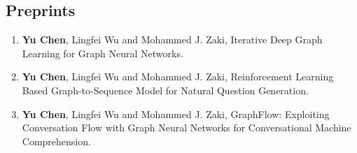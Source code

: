 \documentclass[11pt,a4paper,sans]{moderncv} %
\begin{document}
\subsection{Preprints}
{\footnotesize
\begin{enumerate}

\item  \textbf{Yu Chen}, Lingfei Wu and Mohammed J. Zaki, Iterative Deep Graph Learning for Graph Neural Networks.
\item  \textbf{Yu Chen}, Lingfei Wu and Mohammed J. Zaki, Reinforcement Learning Based Graph-to-Sequence Model for Natural Question Generation.
\item  \textbf{Yu Chen}, Lingfei Wu and Mohammed J. Zaki, GraphFlow: Exploiting Conversation Flow with Graph Neural Networks for Conversational Machine Comprehension. 

 \end{enumerate}
}

 
\end{document}
